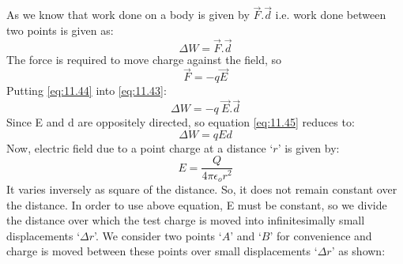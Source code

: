 As we know that work done on a
body is given by $\vec{F}.\vec{d}$ i.e. work done between two points is given as:
\begin{equation}\label{eq:11.43}
  \Delta W = \vec{F} . \vec{d} 
\end{equation}
The force is required to move charge against the field, so
\begin{equation} \label{eq:11.44}
  \vec{F} = - q\vec{E}
\end{equation}
Putting \ref{eq:11.44} into \ref{eq:11.43}:
\begin{equation}\label{eq:11.45}
  \Delta W = -q\:\vec{E} . \vec{d} 
\end{equation}
Since E and d are oppositely directed, so equation \ref{eq:11.45} reduces to:
\begin{equation}\label{eq:11.46}
  \Delta W = qEd 
\end{equation}
Now, electric field due to a point charge at a distance `$r$' is given by:
\begin{equation}\label{eq:11.47}
  E = \frac{Q}{4\pi\epsilon_{o} r^{2}}
\end{equation}
It varies inversely as square of the distance.
So, it does not remain constant over the distance. In order to use above equation,
E must be constant, so we divide the distance over which the test
charge is moved into infinitesimally small displacements `$\Delta r$'.
We consider two points `$A$' and `$B$' for convenience and charge is
moved between these points over small displacements `$\Delta r$' as shown:

